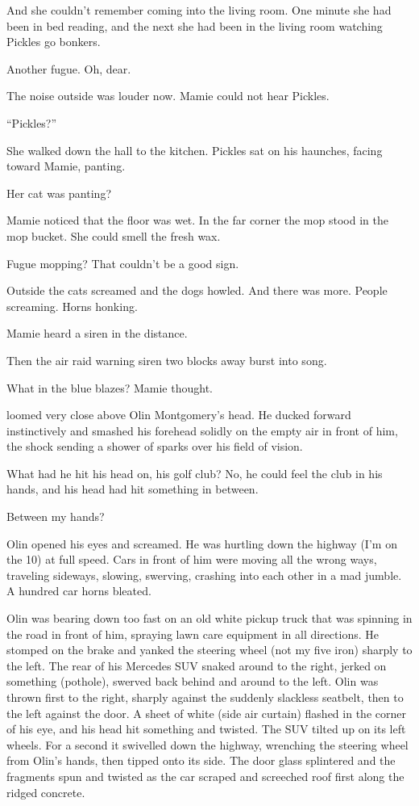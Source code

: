 And she couldn’t remember coming into the living room. One minute she had been in bed reading, and the next she had been in the living room watching Pickles go bonkers.

Another fugue. Oh, dear.

The noise outside was louder now. Mamie could not hear Pickles.

“Pickles?”

She walked down the hall to the kitchen. Pickles sat on his haunches, facing toward Mamie, panting.

Her cat was panting?

Mamie noticed that the floor was wet. In the far corner the mop stood in the mop bucket. She could smell the fresh wax.

Fugue mopping? That couldn’t be a good sign.

Outside the cats screamed and the dogs howled. And there was more. People screaming. Horns honking.

Mamie heard a siren in the distance.

Then the air raid warning siren two blocks away burst into song.

What in the blue blazes? Mamie thought.




 loomed very close above Olin Montgomery’s head. He ducked forward instinctively and smashed his forehead solidly on the empty air in front of him, the shock sending a shower of sparks over his field of vision.

What had he hit his head on, his golf club? No, he could feel the club in his hands, and his head had hit something in between.

Between my hands?

Olin opened his eyes and screamed. He was hurtling down the highway (I’m on the 10) at full speed. Cars in front of him were moving all the wrong ways, traveling sideways, slowing, swerving, crashing into each other in a mad jumble. A hundred car horns bleated.

Olin was bearing down too fast on an old white pickup truck that was spinning in the road in front of him, spraying lawn care equipment in all directions. He stomped on the brake and yanked the steering wheel (not my five iron) sharply to the left. The rear of his Mercedes SUV snaked around to the right, jerked on something (pothole), swerved back behind and around to the left. Olin was thrown first to the right, sharply against the suddenly slackless seatbelt, then to the left against the door. A sheet of white (side air curtain) flashed in the corner of his eye, and his head hit something and twisted. The SUV tilted up on its left wheels. For a second it swivelled down the highway, wrenching the steering wheel from Olin’s hands, then tipped onto its side. The door glass splintered and the fragments spun and twisted as the car scraped and screeched roof first along the ridged concrete.

